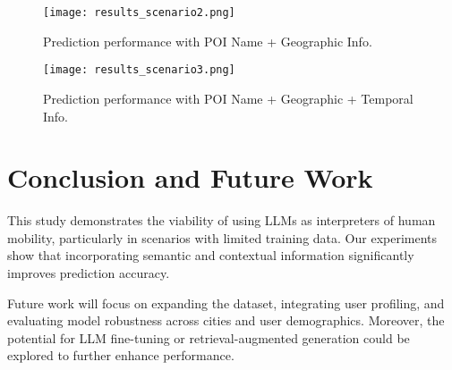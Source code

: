 \documentclass[a4paper,12pt]{article}
\begin{document}
\begin{figure}[H]
    \centering
    \texttt{[image: results\_scenario2.png]}
    \caption{Prediction performance with POI Name + Geographic Info.}
\end{figure}

\begin{figure}[H]
    \centering
    \texttt{[image: results\_scenario3.png]}
    \caption{Prediction performance with POI Name + Geographic + Temporal Info.}
\end{figure}

\clearpage
\section{Conclusion and Future Work} \par

This study demonstrates the viability of using LLMs as interpreters of human mobility, particularly in scenarios with limited training data. Our experiments show that incorporating semantic and contextual information significantly improves prediction accuracy.

Future work will focus on expanding the dataset, integrating user profiling, and evaluating model robustness across cities and user demographics. Moreover, the potential for LLM fine-tuning or retrieval-augmented generation could be explored to further enhance performance.
\end{document}
